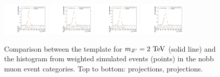 \begin{figure}[htpb]
  \includegraphics[width=0.2\textwidth]{fig/2Dfit/templateVsReco_ZprToWW2000_r0_MJ_mu_HP_nobb_LDy.pdf}
  \includegraphics[width=0.2\textwidth]{fig/2Dfit/templateVsReco_ZprToWW2000_r0_MJ_mu_LP_nobb_LDy.pdf}
  \includegraphics[width=0.2\textwidth]{fig/2Dfit/templateVsReco_ZprToWW2000_r0_MJ_mu_HP_nobb_HDy.pdf}
  \includegraphics[width=0.2\textwidth]{fig/2Dfit/templateVsReco_ZprToWW2000_r0_MJ_mu_LP_nobb_HDy.pdf}\\
  \caption{
    Comparison between the \DY\ZprtoWW template for $m_{\Zpr}=2\unit{TeV}$ (solid line) and the histogram from weighted simulated events (points) in the nobb muon event categories.
    Top to bottom: \MVV projections, \MJ projections.
  }
  \label{fig:1dtemplateVsReco_ZprToWW2000_Run2}
\end{figure}


